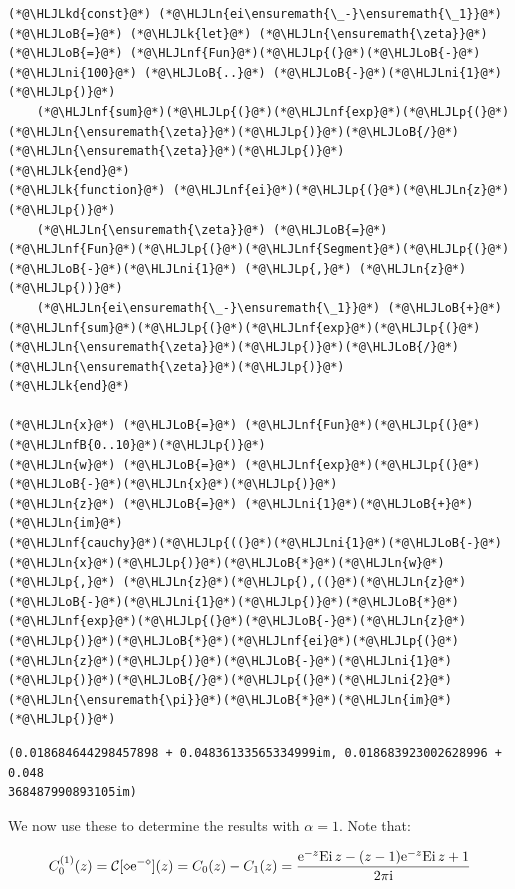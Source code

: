 \documentclass[12pt,a4paper]{article}
\newcommand{\HLJLk}[1]{\textcolor[RGB]{148,91,176}{\textbf{#1}}}
\newcommand{\HLJLkd}[1]{\textcolor[RGB]{214,102,97}{\textit{#1}}}
\newcommand{\HLJLn}[1]{#1}
\newcommand{\HLJLnf}[1]{\textcolor[RGB]{66,102,213}{#1}}
\newcommand{\HLJLnfB}[1]{\textcolor[RGB]{59,151,46}{#1}}
\newcommand{\HLJLni}[1]{\textcolor[RGB]{59,151,46}{#1}}
\newcommand{\HLJLoB}[1]{\textcolor[RGB]{102,102,102}{\textbf{#1}}}
\newcommand{\HLJLp}[1]{#1}
\def\I{ {\rm i} }
\def\E{ {\rm e} }
\def\CC{ {\cal C} }
\def\Ei{ {\rm Ei}\, }
\begin{document}
\begin{lstlisting}
(*@\HLJLkd{const}@*) (*@\HLJLn{ei\ensuremath{\_-}\ensuremath{\_1}}@*) (*@\HLJLoB{=}@*) (*@\HLJLk{let}@*) (*@\HLJLn{\ensuremath{\zeta}}@*) (*@\HLJLoB{=}@*) (*@\HLJLnf{Fun}@*)(*@\HLJLp{(}@*)(*@\HLJLoB{-}@*)(*@\HLJLni{100}@*) (*@\HLJLoB{..}@*) (*@\HLJLoB{-}@*)(*@\HLJLni{1}@*)(*@\HLJLp{)}@*)
    (*@\HLJLnf{sum}@*)(*@\HLJLp{(}@*)(*@\HLJLnf{exp}@*)(*@\HLJLp{(}@*)(*@\HLJLn{\ensuremath{\zeta}}@*)(*@\HLJLp{)}@*)(*@\HLJLoB{/}@*)(*@\HLJLn{\ensuremath{\zeta}}@*)(*@\HLJLp{)}@*)
(*@\HLJLk{end}@*)
(*@\HLJLk{function}@*) (*@\HLJLnf{ei}@*)(*@\HLJLp{(}@*)(*@\HLJLn{z}@*)(*@\HLJLp{)}@*) 
    (*@\HLJLn{\ensuremath{\zeta}}@*) (*@\HLJLoB{=}@*) (*@\HLJLnf{Fun}@*)(*@\HLJLp{(}@*)(*@\HLJLnf{Segment}@*)(*@\HLJLp{(}@*)(*@\HLJLoB{-}@*)(*@\HLJLni{1}@*) (*@\HLJLp{,}@*) (*@\HLJLn{z}@*)(*@\HLJLp{))}@*)
    (*@\HLJLn{ei\ensuremath{\_-}\ensuremath{\_1}}@*) (*@\HLJLoB{+}@*) (*@\HLJLnf{sum}@*)(*@\HLJLp{(}@*)(*@\HLJLnf{exp}@*)(*@\HLJLp{(}@*)(*@\HLJLn{\ensuremath{\zeta}}@*)(*@\HLJLp{)}@*)(*@\HLJLoB{/}@*)(*@\HLJLn{\ensuremath{\zeta}}@*)(*@\HLJLp{)}@*)
(*@\HLJLk{end}@*)

(*@\HLJLn{x}@*) (*@\HLJLoB{=}@*) (*@\HLJLnf{Fun}@*)(*@\HLJLp{(}@*)(*@\HLJLnfB{0..10}@*)(*@\HLJLp{)}@*)
(*@\HLJLn{w}@*) (*@\HLJLoB{=}@*) (*@\HLJLnf{exp}@*)(*@\HLJLp{(}@*)(*@\HLJLoB{-}@*)(*@\HLJLn{x}@*)(*@\HLJLp{)}@*)
(*@\HLJLn{z}@*) (*@\HLJLoB{=}@*) (*@\HLJLni{1}@*)(*@\HLJLoB{+}@*)(*@\HLJLn{im}@*)
(*@\HLJLnf{cauchy}@*)(*@\HLJLp{((}@*)(*@\HLJLni{1}@*)(*@\HLJLoB{-}@*)(*@\HLJLn{x}@*)(*@\HLJLp{)}@*)(*@\HLJLoB{*}@*)(*@\HLJLn{w}@*)(*@\HLJLp{,}@*) (*@\HLJLn{z}@*)(*@\HLJLp{),((}@*)(*@\HLJLn{z}@*)(*@\HLJLoB{-}@*)(*@\HLJLni{1}@*)(*@\HLJLp{)}@*)(*@\HLJLoB{*}@*)(*@\HLJLnf{exp}@*)(*@\HLJLp{(}@*)(*@\HLJLoB{-}@*)(*@\HLJLn{z}@*)(*@\HLJLp{)}@*)(*@\HLJLoB{*}@*)(*@\HLJLnf{ei}@*)(*@\HLJLp{(}@*)(*@\HLJLn{z}@*)(*@\HLJLp{)}@*)(*@\HLJLoB{-}@*)(*@\HLJLni{1}@*)(*@\HLJLp{)}@*)(*@\HLJLoB{/}@*)(*@\HLJLp{(}@*)(*@\HLJLni{2}@*)(*@\HLJLn{\ensuremath{\pi}}@*)(*@\HLJLoB{*}@*)(*@\HLJLn{im}@*)(*@\HLJLp{)}@*)
\end{lstlisting}

\begin{lstlisting}
(0.018684644298457898 + 0.04836133565334999im, 0.018683923002628996 + 0.048
368487990893105im)
\end{lstlisting}


We now use these to determine the results with $\alpha = 1$. Note that:

\[
C_0^{(1)}(z) = \CC[\diamond \E^{-\diamond}](z) =C_0(z) - C_1(z) = { \E^{-z} \Ei z - (z-1) \E^{-z} \Ei z +1 \over 2 \pi \I} 
\]
\end{document}
